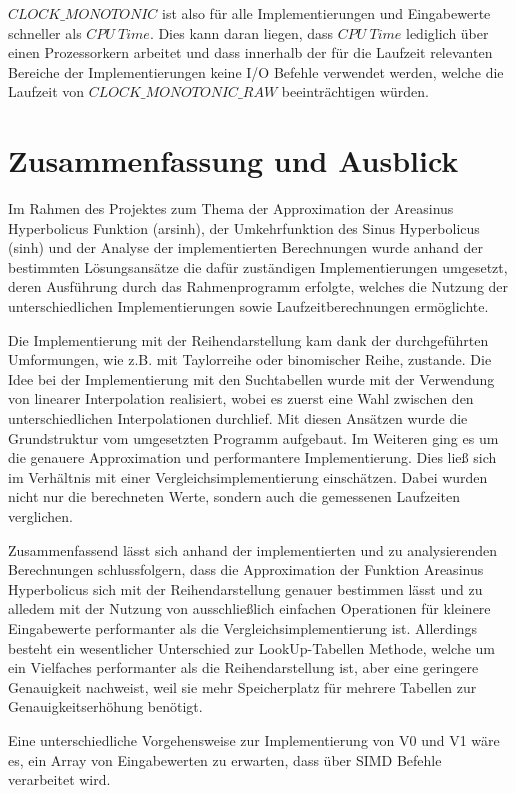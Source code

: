 \documentclass[course=erap]{aspdoc}
\begin{document}
$CLOCK\_MONOTONIC$ ist also für alle Implementierungen und Eingabewerte schneller als $CPU \ Time$. Dies kann daran liegen, dass $CPU \ Time$ lediglich über einen Prozessorkern arbeitet und dass innerhalb der für die Laufzeit relevanten Bereiche der Implementierungen keine I/O Befehle verwendet werden, welche die Laufzeit von $CLOCK\_MONOTONIC\_RAW$ beeinträchtigen würden.
 
 \section{Zusammenfassung und Ausblick}
 
 Im Rahmen des Projektes zum Thema der Approximation der Areasinus Hyperbolicus Funktion (arsinh), der Umkehrfunktion des Sinus Hyperbolicus (sinh) und der Analyse der implementierten Berechnungen wurde anhand der bestimmten Lösungsansätze die dafür zuständigen Implementierungen umgesetzt, deren Ausführung durch das Rahmenprogramm erfolgte, welches die Nutzung der unterschiedlichen Implementierungen sowie Laufzeitberechnungen ermöglichte.   
 
 Die Implementierung mit der Reihendarstellung kam dank der durchgeführten Umformungen, wie z.B. mit Taylorreihe oder binomischer Reihe, zustande. Die Idee bei der Implementierung mit den Suchtabellen wurde mit der Verwendung von linearer Interpolation realisiert, wobei es zuerst eine Wahl zwischen den unterschiedlichen Interpolationen durchlief. Mit diesen Ansätzen wurde die Grundstruktur vom umgesetzten Programm aufgebaut. Im Weiteren ging es um die genauere Approximation und performantere Implementierung. Dies ließ sich im Verhältnis mit einer Vergleichsimplementierung einschätzen. Dabei wurden nicht nur die berechneten Werte, sondern auch die gemessenen Laufzeiten verglichen.  
 
 Zusammenfassend lässt sich anhand der implementierten und zu analysierenden Berechnungen schlussfolgern, dass die Approximation der Funktion Areasinus Hyperbolicus  sich mit der Reihendarstellung genauer bestimmen lässt und zu alledem mit der Nutzung von ausschließlich einfachen Operationen für kleinere Eingabewerte performanter als die Vergleichsimplementierung ist. Allerdings besteht ein wesentlicher Unterschied zur LookUp-Tabellen Methode, welche um ein Vielfaches performanter als die Reihendarstellung ist, aber eine geringere Genauigkeit nachweist, weil sie mehr Speicherplatz für mehrere Tabellen zur Genauigkeitserhöhung benötigt.
 
 Eine unterschiedliche Vorgehensweise zur Implementierung von V0 und V1 wäre es, ein Array von Eingabewerten zu erwarten, dass über SIMD Befehle verarbeitet wird.
 
 
 
 {}
 
\end{document}
